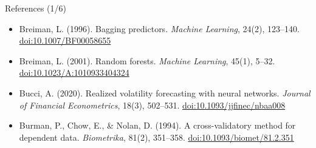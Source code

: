 \begin{frame}{References (1/6)}
\begin{itemize}
    \item Breiman, L. (1996). Bagging predictors. \textit{Machine Learning}, 24(2), 123--140. \href{https://doi.org/10.1007/BF00058655}{doi:10.1007/BF00058655}
    \item Breiman, L. (2001). Random forests. \textit{Machine Learning}, 45(1), 5--32. \href{https://doi.org/10.1023/A:1010933404324}{doi:10.1023/A:1010933404324}
    \item Bucci, A. (2020). Realized volatility forecasting with neural networks. \textit{Journal of Financial Econometrics}, 18(3), 502--531. \href{https://doi.org/10.1093/jjfinec/nbaa008}{doi:10.1093/jjfinec/nbaa008}
    \item Burman, P., Chow, E., \& Nolan, D. (1994). A cross-validatory method for dependent data. \textit{Biometrika}, 81(2), 351--358. \href{https://doi.org/10.1093/biomet/81.2.351}{doi:10.1093/biomet/81.2.351}
\end{itemize}
\end{frame}

